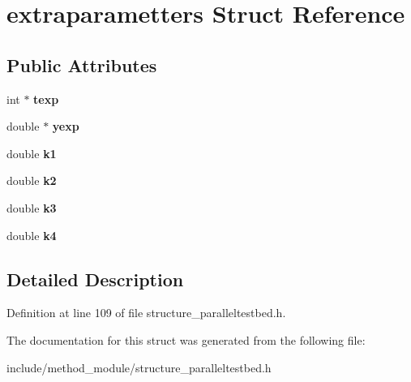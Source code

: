 \hypertarget{structextraparametters}{\section{extraparametters Struct Reference}
\label{structextraparametters}
}
\subsection*{Public Attributes}
\begin{DoxyCompactItemize}
\item 
\hypertarget{structextraparametters_a4aa18ac0b4d848d5017a1face14fe2fc}{int $\ast$ {\bfseries texp}}\label{structextraparametters_a4aa18ac0b4d848d5017a1face14fe2fc}

\item 
\hypertarget{structextraparametters_a7996770d688f3507fcc607ad483d1cb3}{double $\ast$ {\bfseries yexp}}\label{structextraparametters_a7996770d688f3507fcc607ad483d1cb3}

\item 
\hypertarget{structextraparametters_a1a1abe5aff46e0adcaa5657389ffdff1}{double {\bfseries k1}}\label{structextraparametters_a1a1abe5aff46e0adcaa5657389ffdff1}

\item 
\hypertarget{structextraparametters_a137abd65101db57f4d776e343927d7f5}{double {\bfseries k2}}\label{structextraparametters_a137abd65101db57f4d776e343927d7f5}

\item 
\hypertarget{structextraparametters_a88b3c1e1c6172fe1bacf64aa04dcbaa8}{double {\bfseries k3}}\label{structextraparametters_a88b3c1e1c6172fe1bacf64aa04dcbaa8}

\item 
\hypertarget{structextraparametters_aa7c5c5e741cd3eb8203c568c43277145}{double {\bfseries k4}}\label{structextraparametters_aa7c5c5e741cd3eb8203c568c43277145}

\end{DoxyCompactItemize}


\subsection{Detailed Description}


Definition at line 109 of file structure\-\_\-paralleltestbed.\-h.



The documentation for this struct was generated from the following file\-:\begin{DoxyCompactItemize}
\item 
include/method\-\_\-module/structure\-\_\-paralleltestbed.\-h\end{DoxyCompactItemize}
